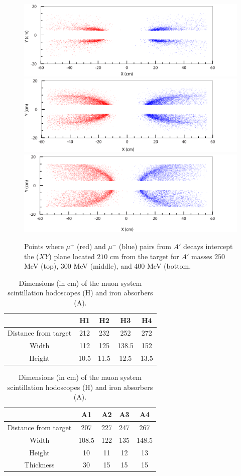 \begin{figure}[!ht]
\includegraphics[scale=0.6]{muon/xy_m250.png}
\includegraphics[scale=0.6]{muon/xy_m300.png}
\includegraphics[scale=0.6]{muon/xy_m400.png}
\caption{\small{Points where $\mu^+$ (red) and $\mu^-$ (blue) pairs from $A'$ decays intercept the ($XY$) plane located $210$ cm from the 
target for $A'$ masses $250$ MeV (top), $300$ MeV (middle), and $400$ MeV (bottom.}}\label{fig:xymu}
\end{figure}

\begin{table}[htdp]
\caption{Dimensions (in cm) of the muon system scintillation hodoscopes (H) and iron absorbers (A). }
\begin{center}
\begin{tabular}{|c|c|c|c|c|}
\hline
&H1&H2&H3&H4\\
\hline
Distance from target& 212&232&252&272\\
Width&112&125&138.5&152\\
Height&10.5&11.5&12.5&13.5\\
\hline
\end{tabular}

\begin{tabular}{|c|c|c|c|c|}
\hline
&A1&A2&A3&A4\\
\hline
Distance from target& 207&227&247&267\\
Width&108.5&122&135&148.5\\
Height&10&11&12&13\\
Thickness & 30 & 15& 15 & 15\\
\hline
\end{tabular}
\end{center}
\label{tb:muon}
\end{table}%


